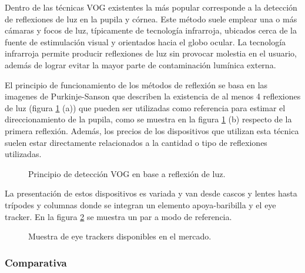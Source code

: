 \documentclass[../main.tex]{subfiles}
\begin{document}
\begin{enumerate}
					Dentro de las técnicas VOG existentes la más popular corresponde a la detección de reflexiones de luz en la pupila y córnea. Este método suele emplear una o más cámaras y focos de luz, típicamente de tecnología infrarroja, ubicados cerca de la fuente de estimulación visual y orientados hacia el globo ocular. La tecnología infrarroja permite producir reflexiones de luz sin provocar molestia en el usuario, además de lograr evitar la mayor parte de contaminación lumínica externa. 

					El principio de funcionamiento de los métodos de reflexión se basa en las imagenes de Purkinje-Sanson que describen la existencia de al menos 4 reflexiones de luz (figura \ref{fig:02_et_vog1} (a)) que pueden ser utilizadas como referencia para estimar el direccionamiento de la pupila, como se muestra en la figura \ref{fig:02_et_vog1} (b) respecto de la primera reflexión. Además, los precios de los dispositivos que utilizan esta técnica suelen estar directamente relacionados a la cantidad o tipo de reflexiones utilizadas.
					\begin{figure}[H]
						\centering
						\hspace{5mm}
						\caption{Principio de detección VOG en base a reflexión de luz\cite{dissertation:eyetrackers}.}
						\label{fig:02_et_vog1}
					\end{figure}

					La presentación de estos dispositivos es variada y van desde cascos y lentes hasta trípodes y columnas donde se integran un elemento apoya-baribilla y el eye tracker. En la figura \ref{fig:02_et_vog2} se muestra un par a modo de referencia. 
					\begin{figure}[H]
						\centering
						\hspace{5mm}
						\caption{Muestra de eye trackers disponibles en el mercado.}
						\label{fig:02_et_vog2}
					\end{figure}  

				\end{enumerate}

			\subsubsection{Comparativa}
			\label{ssub:02_comparativa_eyetracker}
\end{document}
